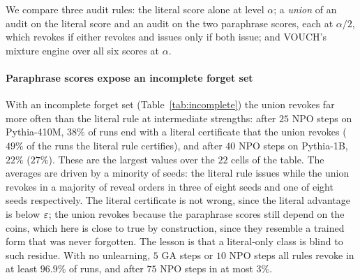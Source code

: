 We compare three audit rules: the literal score alone at level $\alpha$; a \emph{union} of an
audit on the literal score and an audit on the two paraphrase scores, each at $\alpha/2$,
which revokes if either revokes and issues only if both issue; and VOUCH's mixture engine over
all six scores at $\alpha$.

\begin{table}[t]
\centering\footnotesize
\caption{Incomplete forget set: mean calibrated advantages over eight seeds and fraction of
runs (seeds $\times$ $40$ reveal orders) revoked by the literal and by the union rule; A is the
fraction of runs in which the literal rule issues a certificate and the union rule revokes.
$\eps=0.2$, $\alpha=0.05$.}
\label{tab:incomplete}

\end{table}

\paragraph{Paraphrase scores expose an incomplete forget set} With an incomplete forget set
(Table~\ref{tab:incomplete}) the union revokes far more often than the literal rule at
intermediate strengths: after $25$ NPO steps on Pythia-410M, $38\%$ of runs end with a literal
certificate that the union revokes ($49\%$ of the runs the literal rule certifies), and after
$40$ NPO steps on Pythia-1B, $22\%$ ($27\%$). These are the largest values over the $22$
cells of the table. The averages
are driven by a minority of seeds: the literal rule issues while the union revokes in a
majority of reveal orders in three of eight seeds and one of eight seeds respectively. The
literal certificate is not wrong, since the literal advantage is below $\varepsilon$; the union
revokes because the paraphrase scores still depend on the coins, which here is close to true
by construction, since they resemble a trained form that was never forgotten. The lesson is
that a literal-only class is blind to such residue. With no unlearning, $5$ GA steps or $10$ NPO
steps all rules revoke in at least $96.9\%$ of runs, and after $75$ NPO steps in at most $3\%$.

